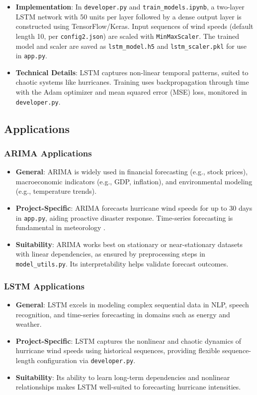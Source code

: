 \begin{itemize}
	\item \textbf{Implementation}: In \texttt{developer.py} and \texttt{train\_models.ipynb}, a two-layer LSTM network with 50 units per layer followed by a dense output layer is constructed using TensorFlow/Keras. Input sequences of wind speeds (default length 10, per \texttt{config2.json}) are scaled with \texttt{MinMaxScaler}. The trained model and scaler are saved as \texttt{lstm\_model.h5} and \texttt{lstm\_scaler.pkl} for use in \texttt{app.py}.
	\item \textbf{Technical Details}: LSTM captures non-linear temporal patterns, suited to chaotic systems like hurricanes. Training uses backpropagation through time with the Adam optimizer and mean squared error (MSE) loss, monitored in \texttt{developer.py}.
\end{itemize}

\subsection{Applications}

\subsubsection{ARIMA Applications}

\begin{itemize}
	\item \textbf{General}: ARIMA is widely used in financial forecasting (e.g., stock prices), macroeconomic indicators (e.g., GDP, inflation), and environmental modeling (e.g., temperature trends).
	\item \textbf{Project-Specific}: ARIMA forecasts hurricane wind speeds for up to 30 days in \texttt{app.py}, aiding proactive disaster response. Time-series forecasting is fundamental in meteorology \cite{Emanuel2005}.
	\item \textbf{Suitability}: ARIMA works best on stationary or near-stationary datasets with linear dependencies, as ensured by preprocessing steps in \texttt{model\_utils.py}. Its interpretability helps validate forecast outcomes.
\end{itemize}

\subsubsection{LSTM Applications}

\begin{itemize}
	\item \textbf{General}: LSTM excels in modeling complex sequential data in NLP, speech recognition, and time-series forecasting in domains such as energy and weather.
	\item \textbf{Project-Specific}: LSTM captures the nonlinear and chaotic dynamics of hurricane wind speeds using historical sequences, providing flexible sequence-length configuration via \texttt{developer.py}.
	\item \textbf{Suitability}: Its ability to learn long-term dependencies and nonlinear relationships makes LSTM well-suited to forecasting hurricane intensities.
\end{itemize}

